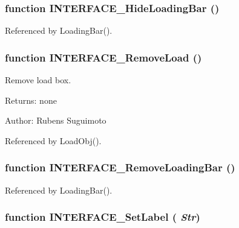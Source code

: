 \subsubsection[INTERFACE\_\-HideLoadingBar]{\setlength{\rightskip}{0pt plus 5cm}function INTERFACE\_\-HideLoadingBar ()}\label{interface_2load_8js_3b3fa88548389069ad5612e3144fc62a}




Referenced by LoadingBar().
\subsubsection[INTERFACE\_\-RemoveLoad]{\setlength{\rightskip}{0pt plus 5cm}function INTERFACE\_\-RemoveLoad ()}\label{interface_2load_8js_cf25096e6cbf314a97e97690e44141e5}


Remove load box. 

\begin{Desc}
\item[Returns:]none \end{Desc}
\begin{Desc}
\item[Author:]Rubens Suguimoto \end{Desc}


Referenced by LoadObj().
\subsubsection[INTERFACE\_\-RemoveLoadingBar]{\setlength{\rightskip}{0pt plus 5cm}function INTERFACE\_\-RemoveLoadingBar ()}\label{interface_2load_8js_a094a9a9b6ae6e661ea25772a4106c7f}




Referenced by LoadingBar().
\subsubsection[INTERFACE\_\-SetLabel]{\setlength{\rightskip}{0pt plus 5cm}function INTERFACE\_\-SetLabel ( {\em Str})}\label{interface_2load_8js_0e4be88d1f78ce3e7235510666b2ba88}


